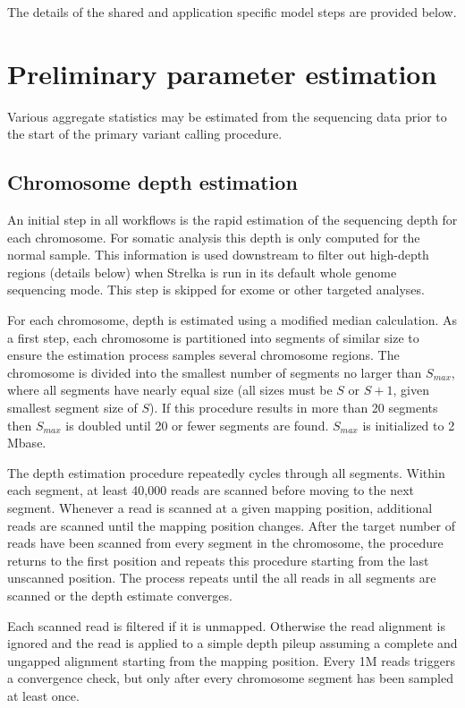 \documentclass{article}
\begin{document}
The details of the shared and application specific model steps are provided below.



\section{Preliminary parameter estimation}

Various aggregate statistics may be estimated from the sequencing data prior to the start of the primary variant calling procedure.

\subsection{Chromosome depth estimation}
\label{sec:depth_est}

An initial step in all workflows is the rapid estimation of the sequencing depth for each chromosome. For somatic analysis this depth is only computed for the normal sample. This information is used downstream to filter out high-depth regions (details below) when Strelka is run in its default whole genome sequencing mode. This step is skipped for exome or other targeted analyses.

For each chromosome, depth is estimated using a modified median calculation. As a first step, each chromosome is partitioned into segments of similar size to ensure the estimation process samples several chromosome regions. The chromosome is divided into the smallest number of segments no larger than $S_{max}$, where all segments have nearly equal size (all sizes must be $S$ or $S+1$, given smallest segment size of $S$). If this procedure results in more than 20 segments then $S_{max}$ is doubled until 20 or fewer segments are found. $S_{max}$ is initialized to 2 Mbase.

The depth estimation procedure repeatedly cycles through all segments. Within each segment, at least 40,000 reads are scanned before moving to the next segment. Whenever a read is scanned at a given mapping position, additional reads are scanned until the mapping position changes. After the target number of reads have been scanned from every segment in the chromosome, the procedure returns to the first position and repeats this procedure starting from the last unscanned position. The process repeats until the all reads in all segments are scanned or the depth estimate converges.

Each scanned read is filtered if it is unmapped. Otherwise the read alignment is ignored and the read is applied to a simple depth pileup assuming a complete and ungapped alignment starting from the mapping position. Every 1M reads triggers a convergence check, but only after every chromosome segment has been sampled at least once.
\end{document}
